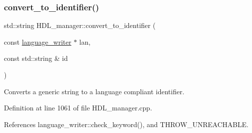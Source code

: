\subsubsection{\texorpdfstring{convert\+\_\+to\+\_\+identifier()}{convert\_to\_identifier()}\hspace{0.1cm}{\footnotesize\ttfamily [1/2]}}
{\footnotesize\ttfamily std\+::string H\+D\+L\+\_\+manager\+::convert\+\_\+to\+\_\+identifier (\begin{DoxyParamCaption}\item[{const \hyperlink{classlanguage__writer}{language\+\_\+writer} $\ast$}]{lan,  }\item[{const std\+::string \&}]{id }\end{DoxyParamCaption})\hspace{0.3cm}{\ttfamily [static]}}



Converts a generic string to a language compliant identifier. 



Definition at line 1061 of file H\+D\+L\+\_\+manager.\+cpp.



References language\+\_\+writer\+::check\+\_\+keyword(), and T\+H\+R\+O\+W\+\_\+\+U\+N\+R\+E\+A\+C\+H\+A\+B\+LE.



